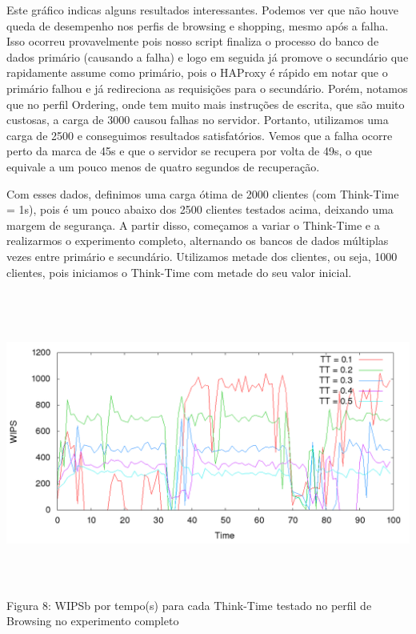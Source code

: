 \documentclass[11pt,twoside]{article}
\begin{document}
Este gráfico indicas alguns resultados interessantes. Podemos ver que não houve queda de desempenho nos perfis de browsing e shopping, mesmo após a falha. Isso ocorreu provavelmente pois nosso script finaliza o processo do banco de dados primário (causando a falha) e logo em seguida já promove o secundário que rapidamente assume como primário, pois o HAProxy é rápido em notar que o primário falhou e já redireciona as requisições para o secundário.
Porém, notamos que no perfil Ordering, onde tem muito mais instruções de escrita, que são muito custosas, a carga de 3000 causou falhas no servidor. Portanto, utilizamos uma carga de 2500 e conseguimos resultados satisfatórios. Vemos que a falha ocorre perto da marca de 45s e que o servidor se recupera por volta de 49s, o que equivale a um pouco menos de quatro segundos de recuperação.

Com esses dados, definimos uma carga ótima de 2000 clientes (com Think-Time = 1s), pois é um pouco abaixo dos 2500 clientes testados acima, deixando uma margem de segurança. A partir disso, começamos a variar o Think-Time e a realizarmos o experimento completo, alternando os bancos de dados múltiplas vezes entre primário e secundário. Utilizamos metade dos clientes, ou seja, 1000 clientes, pois iniciamos o Think-Time com metade do seu valor inicial.

\begin{center}
\includegraphics[width=15cm, height=10cm]{images/completo/plot_browsing.png}
Figura 8: WIPSb por tempo(s) para cada Think-Time testado no perfil de Browsing no experimento completo
\end{center}
\end{document}
